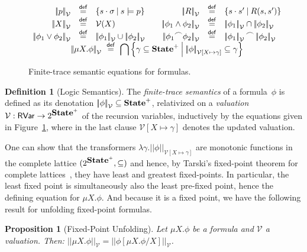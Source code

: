 \documentclass[10pt,a4paper]{amsart}
\newtheorem{proposition}[theorem]{Proposition}
\theoremstyle{definition}
\newtheorem{definition}[theorem]{Definition}
\newcommand{\bordertext}[1]{\setlength{\fboxsep}{5pt}\setlength{\fboxrule}{0.5pt}\fbox{\parbox[c]{0.95\textwidth}{#1}}}
\newcommand{\defeq}{\stackrel{\mathsf{def}}{=}}
\newcommand{\setdef}[2]{\left\{ #1 \>\middle|\> #2 \right\}}
\newcommand{\logdenot}[1]{\left|\!\left|#1\right|\!\right|_{\mathcal{V}}}
\newcommand{\logdenotsubst}[3]{\left|\!\left|#1\right|\!\right|_{\mathcal{V} [#2 \mapsto #3]}}
\newcommand{\chop}[0]{\raisebox{1ex}{$\frown$}}
\newcommand{\State}{\mbox{\bf State}}
\begin{document}
\begin{figure}%
  \centering
  $ \begin{array}{rcl@{\qquad}rcl}
   \logdenot{p}  & \defeq & 
      \setdef{s \cdot \sigma}{s \models p} &
   \logdenot{R}  & \defeq & 
      \setdef{s \cdot s'}{R (s, s')} \\
   \logdenot{X}  & \defeq & 
      \mathcal{V} (X) &
   \logdenot{\phi_1 \wedge \phi_2}  & \defeq & 
      \logdenot{\phi_1} \cap \logdenot{\phi_2} \\
   \logdenot{\phi_1 \vee \phi_2}  & \defeq & 
      \logdenot{\phi_1} \cup \logdenot{\phi_2} &
   \logdenot{\phi_1 \chop \phi_2}  & \defeq & 
      \logdenot{\phi_1} \chop \logdenot{\phi_2} \\
   \multicolumn{6}{c}{\logdenot{\mu X. \phi}  \ \defeq \ 
      {\displaystyle\bigcap} \setdef{\gamma \subseteq \State^+}
                     {\logdenotsubst{\phi}{X}{\gamma} \subseteq \gamma}}
   \end{array} $
\caption{Finite-trace semantic equations for formulas.}
\label{fig:logic-semantics}
\end{figure}

\begin{definition}[Logic Semantics]
  \label{def:logic-semantics}
  The \emph{finite-trace semantics} of a formula~$\phi$ is defined as
  its denotation $\logdenot{\phi} \subseteq \State^+$, relativized on
  a \emph{valuation}
  $\mathcal{V} : \mathsf{RVar} \rightarrow 2^{\State^+}$ of the
  recursion variables, inductively by the equations given in
  Figure~\ref{fig:logic-semantics}, where in the last clause
  $\mathcal{V} [X \mapsto \gamma]$ denotes the updated valuation.
\end{definition}

One can show that the transformers
$\lambda \gamma.\logdenotsubst{\phi}{X}{\gamma}$ are monotonic
functions in the complete lattice $(2^{\State^+}, \subseteq)$ and
hence, by Tarski's fixed-point theorem for complete
lattices~\cite{tar-53}, they have least and greatest fixed-points.
%
In particular, the least fixed point is simultaneously also the least
pre-fixed point, hence the defining equation for $\mu X. \phi$.
%
And because it is a fixed point, we have the following result for
unfolding fixed-point formulas.

\begin{proposition}[Fixed-Point Unfolding]
  \label{prop:fixed-point-unfolding}
  Let $\mu X. \phi$ be a formula and $\mathcal{V}$ a valuation.  Then:
  $
  \logdenot{\mu X. \phi} = \logdenot{\phi [\mu X. \phi / X]}
  $.
\end{proposition}
\end{document}
